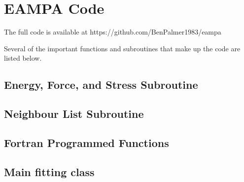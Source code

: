 \chapter{EAMPA Code}
\label{chapter:appendix-eampa}
 
The full code is available at https://github.com/BenPalmer1983/eampa

Several of the important functions and subroutines that make up the code are listed below. 



\section{Energy, Force, and Stress Subroutine}
\label{section:appendixenergyforcestress}





\section{Neighbour List Subroutine}





\section{Fortran Programmed Functions}









\section{Main fitting class}

